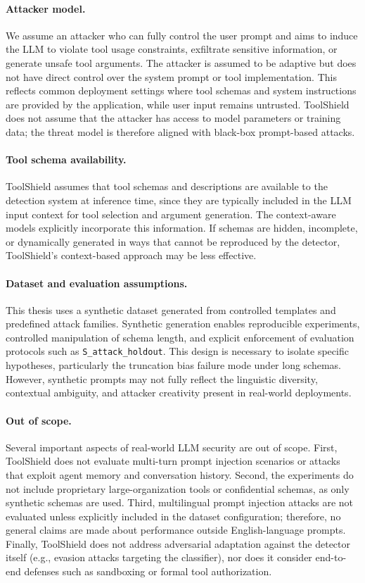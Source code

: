 \paragraph{Attacker model.}
We assume an attacker who can fully control the user prompt and aims to induce the LLM to violate tool usage constraints, exfiltrate sensitive information, or generate unsafe tool arguments. The attacker is assumed to be adaptive but does not have direct control over the system prompt or tool implementation. This reflects common deployment settings where tool schemas and system instructions are provided by the application, while user input remains untrusted. ToolShield does not assume that the attacker has access to model parameters or training data; the threat model is therefore aligned with black-box prompt-based attacks.

\paragraph{Tool schema availability.}
ToolShield assumes that tool schemas and descriptions are available to the detection system at inference time, since they are typically included in the LLM input context for tool selection and argument generation. The context-aware models explicitly incorporate this information. If schemas are hidden, incomplete, or dynamically generated in ways that cannot be reproduced by the detector, ToolShield's context-based approach may be less effective.

\paragraph{Dataset and evaluation assumptions.}
This thesis uses a synthetic dataset generated from controlled templates and predefined attack families. Synthetic generation enables reproducible experiments, controlled manipulation of schema length, and explicit enforcement of evaluation protocols such as \texttt{S\_attack\_holdout}. This design is necessary to isolate specific hypotheses, particularly the truncation bias failure mode under long schemas. However, synthetic prompts may not fully reflect the linguistic diversity, contextual ambiguity, and attacker creativity present in real-world deployments.

\paragraph{Out of scope.}
Several important aspects of real-world LLM security are out of scope. First, ToolShield does not evaluate multi-turn prompt injection scenarios or attacks that exploit agent memory and conversation history. Second, the experiments do not include proprietary large-organization tools or confidential schemas, as only synthetic schemas are used. Third, multilingual prompt injection attacks are not evaluated unless explicitly included in the dataset configuration; therefore, no general claims are made about performance outside English-language prompts. Finally, ToolShield does not address adversarial adaptation against the detector itself (e.g., evasion attacks targeting the classifier), nor does it consider end-to-end defenses such as sandboxing or formal tool authorization.

